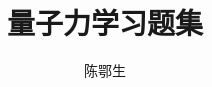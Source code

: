 \documentclass[a4paper,12pt]{book}
\begin{document}
\title{\Huge 量子力学习题集}
\author{\Large 陈鄂生}
\date{}
\maketitle
\newpage








\end{document}
